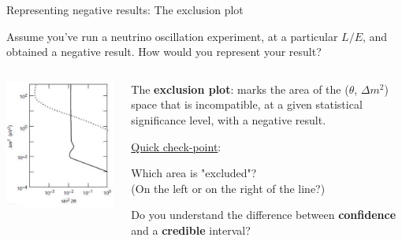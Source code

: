 \begin{frame}{Representing negative results: The exclusion plot}

Assume you've run a neutrino oscillation experiment, at a particular $L/E$,
and obtained a negative result. How would you represent your result?\\
\vspace{0.3cm}

\begin{columns}
  \begin{column}{0.30\textwidth}
    \includegraphics[width=0.99\textwidth]{./images/osc101/exclusion_plot.png}
  \end{column}
  \begin{column}{0.70\textwidth}
     The {\bf exclusion plot}: marks the area of the
     {\color{red}($\theta$, $\Delta m^{2}$)} space that is
     incompatible, at a given statistical significance level, with a
     negative result.\\
     \vspace{0.3cm}
     {\scriptsize
       {\color{capri}
        \underline{Quick check-point}:\\
       }
       \begin{itemize}
       {\color{capri}
        \item Which area is "excluded"?\\
              (On the left or on the right of the line?)
        \item Do you understand the difference between {\bf confidence}
              and a {\bf credible}  interval?
       }
       \end{itemize}
     }
  \end{column}
\end{columns}


\end{frame}

